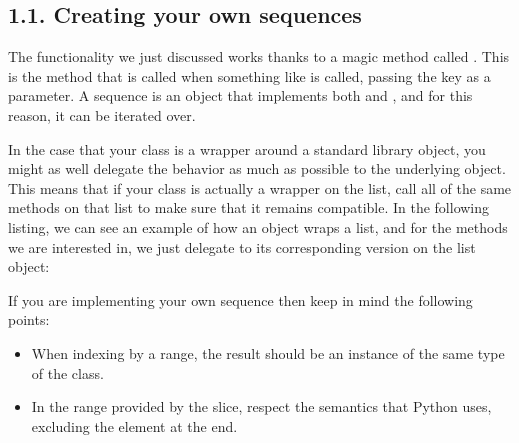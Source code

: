\documentclass[a4paper,10pt,english]{sphinxmanual}
\begin{document}
\subsection{1.1. Creating your own sequences}
\label{\detokenize{chapters/2_pythonic_code/index:creating-your-own-sequences}}
The functionality we just discussed works thanks to a magic method called . This is the method that is
called when something like  is called, passing the key as a parameter. A sequence is an object that
implements both  and , and for this reason, it can be iterated over.

In the case that your class is a wrapper around a standard library object, you might as well delegate the behavior as
much as possible to the underlying object. This means that if your class is actually a wrapper on the list, call all of
the same methods on that list to make sure that it remains compatible. In the following listing, we can see an example
of how an object wraps a list, and for the methods we are interested in, we just delegate to its corresponding version
on the list object:

\begin{sphinxVerbatim}[commandchars=\\\{\}]
 
       
          

      
         

       
         
\end{sphinxVerbatim}

If you are implementing your own sequence then keep in mind the following points:
\begin{itemize}
\item {} 
When indexing by a range, the result should be an instance of the same type of the class.

\item {} 
In the range provided by the slice, respect the semantics that Python uses, excluding the element at the end.

\end{itemize}
\end{document}
